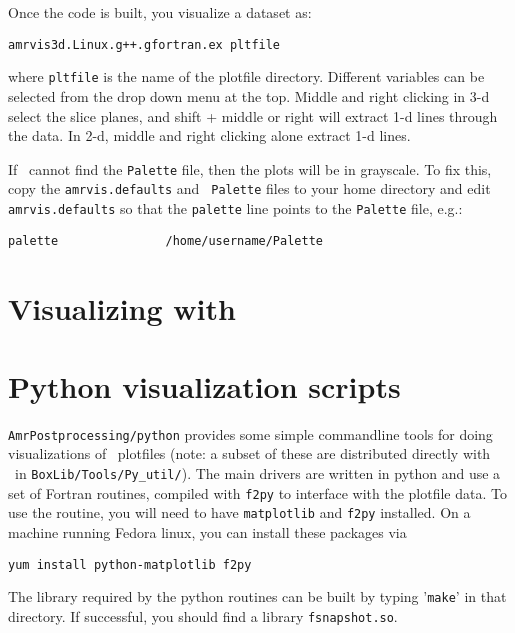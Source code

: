 Once the code is built, you visualize a dataset as:
\begin{verbatim}
amrvis3d.Linux.g++.gfortran.ex pltfile
\end{verbatim}
where {\tt pltfile} is the name of the plotfile directory.  Different
variables can be selected from the drop down menu at the top.  Middle
and right clicking in 3-d select the slice planes, and shift + middle
or right will extract 1-d lines through the data.  In 2-d, middle and
right clicking alone extract 1-d lines.

If \amrvis\ cannot find the {\tt Palette} file, then the plots will be
in grayscale.  To fix this, copy the {\tt amrvis.defaults} and {\tt
  Palette} files to your home directory and edit {\tt amrvis.defaults} so that
the {\tt palette} line points to the {\tt Palette} file, e.g.:
\begin{verbatim}
palette               /home/username/Palette
\end{verbatim}


\section{Visualizing with \visit}



\section{Python visualization scripts}
\label{sec:vis:python}


{\tt AmrPostprocessing/python} provides some simple commandline
tools for doing visualizations of \boxlib\ plotfiles (note: a subset
of these are distributed directly with \boxlib\ in {\tt BoxLib/Tools/Py\_util/}).  The main drivers
are written in python and use a set of Fortran routines, compiled with
{\tt f2py} to interface with the plotfile data.  To use the routine,
you will need to have {\tt matplotlib} and {\tt f2py} installed.  On a
machine running Fedora linux, you can install these packages via
\begin{verbatim}   
yum install python-matplotlib f2py
\end{verbatim}
%
The library required by the python routines can be built by typing
'{\tt make}' in that directory.  If successful, you should find
a library {\tt fsnapshot.so}. 

